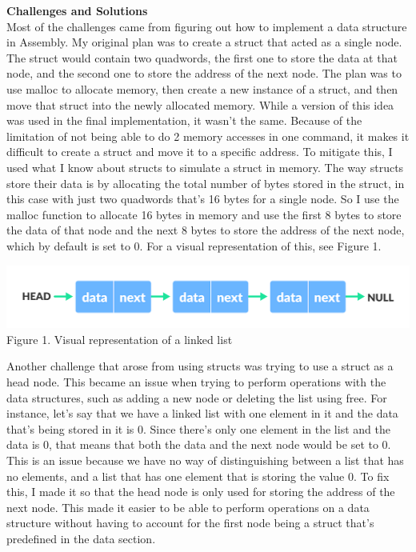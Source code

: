 \documentclass[twoside]{article}
\begin{document}
\noindent \textbf{\Large Challenges and Solutions} \\
Most of the challenges came from figuring out how to implement a data structure in Assembly. My original plan was to create a struct that acted as a single node. The struct would contain two quadwords, the first one to store the data at that node, and the second one to store the address of the next node. The plan was to use malloc to allocate memory, then create a new instance of a struct, and then move that struct into the newly allocated memory. While a version of this idea was used in the final implementation, it wasn’t the same. Because of the limitation of not being able to do 2 memory accesses in one command, it makes it difficult to create a struct and move it to a specific address. To mitigate this, I used what I know about structs to simulate a struct in memory. The way structs store their data is by allocating the total number of bytes stored in the struct, in this case with just two quadwords that’s 16 bytes for a single node. So I use the malloc function to allocate 16 bytes in memory and use the first 8 bytes to store the data of that node and the next 8 bytes to store the address of the next node, which by default is set to 0. For a visual representation of this, see Figure 1.
\begin{center}
    \includegraphics[width=.8\textwidth]{images/linkedList.png}\\
    Figure 1. Visual representation of a linked list
\end{center}

\noindent Another challenge that arose from using structs was trying to use a struct as a head node. This became an issue when trying to perform operations with the data structures, such as adding a new node or deleting the list using free. For instance, let’s say that we have a linked list with one element in it and the data that’s being stored in it is 0. Since there’s only one element in the list and the data is 0, that means that both the data and the next node would be set to 0. This is an issue because we have no way of distinguishing between a list that has no elements, and a list that has one element that is storing the value 0. To fix this, I made it so that the head node is only used for storing the address of the next node. This made it easier to be able to perform operations on a data structure without having to account for the first node being a struct that’s predefined in the data section.\\
\end{document}
